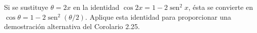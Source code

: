 \item Si se sustituye $\theta = 2x$ en la identidad $\cos 2x = 1 - 2\operatorname{sen}^2 x$, ésta se convierte en $\cos \theta = 1 - 2\operatorname{sen}^2(\theta/2)$. Aplique esta identidad para proporcionar una demostración alternativa del Corolario 2.25.

